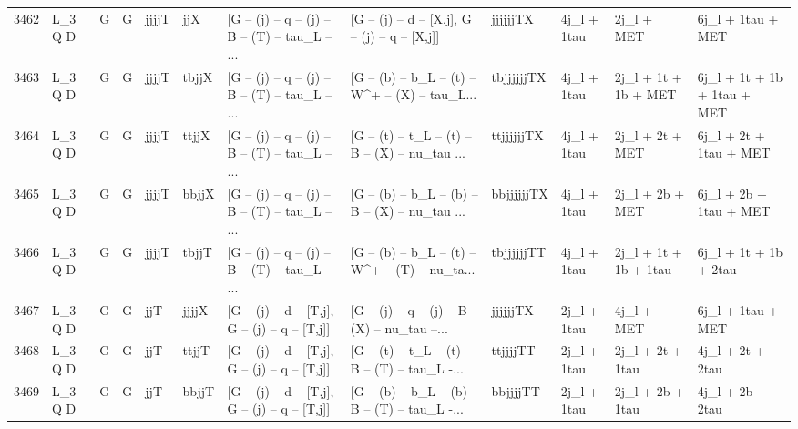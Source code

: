 \begin{tabular}{llllllllllll}
3462 &      L\_3 Q D &     G &     G &       jjjjT &         jjX &  [G -- (j) -- q -- (j) -- B -- (T) -- tau\_L -- ... &   [G -- (j) -- d -- [X,j], G -- (j) -- q -- [X,j]] &    jjjjjjTX &              4j\_l + 1tau &               2j\_l + MET &                  6j\_l + 1tau + MET \\
3463 &      L\_3 Q D &     G &     G &       jjjjT &       tbjjX &  [G -- (j) -- q -- (j) -- B -- (T) -- tau\_L -- ... &  [G -- (b) -- b\_L -- (t) -- W\textasciicircum + -- (X) -- tau\_L... &  tbjjjjjjTX &              4j\_l + 1tau &     2j\_l + 1t + 1b + MET &        6j\_l + 1t + 1b + 1tau + MET \\
3464 &      L\_3 Q D &     G &     G &       jjjjT &       ttjjX &  [G -- (j) -- q -- (j) -- B -- (T) -- tau\_L -- ... &  [G -- (t) -- t\_L -- (t) -- B -- (X) -- nu\_tau ... &  ttjjjjjjTX &              4j\_l + 1tau &          2j\_l + 2t + MET &             6j\_l + 2t + 1tau + MET \\
3465 &      L\_3 Q D &     G &     G &       jjjjT &       bbjjX &  [G -- (j) -- q -- (j) -- B -- (T) -- tau\_L -- ... &  [G -- (b) -- b\_L -- (b) -- B -- (X) -- nu\_tau ... &  bbjjjjjjTX &              4j\_l + 1tau &          2j\_l + 2b + MET &             6j\_l + 2b + 1tau + MET \\
3466 &      L\_3 Q D &     G &     G &       jjjjT &       tbjjT &  [G -- (j) -- q -- (j) -- B -- (T) -- tau\_L -- ... &  [G -- (b) -- b\_L -- (t) -- W\textasciicircum + -- (T) -- nu\_ta... &  tbjjjjjjTT &              4j\_l + 1tau &    2j\_l + 1t + 1b + 1tau &              6j\_l + 1t + 1b + 2tau \\
3467 &      L\_3 Q D &     G &     G &         jjT &       jjjjX &   [G -- (j) -- d -- [T,j], G -- (j) -- q -- [T,j]] &  [G -- (j) -- q -- (j) -- B -- (X) -- nu\_tau --... &    jjjjjjTX &              2j\_l + 1tau &               4j\_l + MET &                  6j\_l + 1tau + MET \\
3468 &      L\_3 Q D &     G &     G &         jjT &       ttjjT &   [G -- (j) -- d -- [T,j], G -- (j) -- q -- [T,j]] &  [G -- (t) -- t\_L -- (t) -- B -- (T) -- tau\_L -... &    ttjjjjTT &              2j\_l + 1tau &         2j\_l + 2t + 1tau &                   4j\_l + 2t + 2tau \\
3469 &      L\_3 Q D &     G &     G &         jjT &       bbjjT &   [G -- (j) -- d -- [T,j], G -- (j) -- q -- [T,j]] &  [G -- (b) -- b\_L -- (b) -- B -- (T) -- tau\_L -... &    bbjjjjTT &              2j\_l + 1tau &         2j\_l + 2b + 1tau &                   4j\_l + 2b + 2tau \\

\end{tabular}
